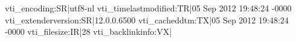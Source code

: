 vti_encoding:SR|utf8-nl
vti_timelastmodified:TR|05 Sep 2012 19:48:24 -0000
vti_extenderversion:SR|12.0.0.6500
vti_cacheddtm:TX|05 Sep 2012 19:48:24 -0000
vti_filesize:IR|28
vti_backlinkinfo:VX|
